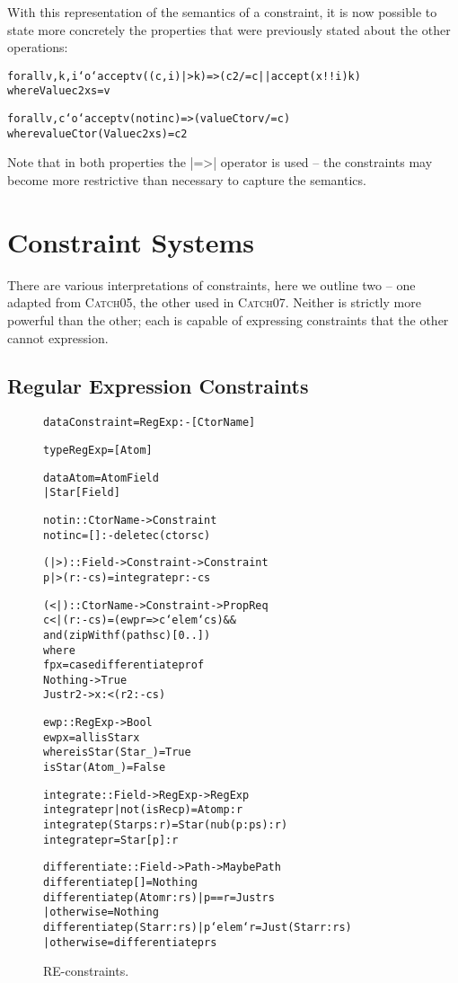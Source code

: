 \documentclass[preprint]{sigplanconf}
\newcommand{\catch}{\textsc{Catch}}
\newenvironment{code}{\begin{alltt}\small}{\end{alltt}}
\begin{document}
With this representation of the semantics of a constraint, it is now possible to state more concretely the properties that were previously stated about the other operations:

\begin{code}
forall v, k, i `o` accept v ((c,i) |> k) => (c2 /= c || accept (x !! i) k)
    where Value c2 xs = v

forall v, c `o` accept v (notin c) => (valueCtor v /= c)
    where valueCtor (Value c2 xs) = c2
\end{code}

Note that in both properties the |=>| operator is used -- the constraints may become more restrictive than necessary to capture the semantics.

\section{Constraint Systems}
\label{sec:constraint}

There are various interpretations of constraints, here we outline two -- one adapted from \catch05, the other used in \catch07. Neither is strictly more powerful than the other; each is capable of expressing constraints that the other cannot expression.

\subsection{Regular Expression Constraints}
\label{sec:regexp}

\begin{figure}
\begin{code}
data Constraint = RegExp :- [CtorName]

type RegExp = [Atom]

data Atom  =  Atom  Field
           |  Star  [Field]

notin :: CtorName -> Constraint
notin c = [] :- delete c (ctors c)

(|>) :: Field -> Constraint -> Constraint
p |> (r :- cs) = integrate p r :- cs

(<|) :: CtorName -> Constraint -> Prop Req
c <| (r :- cs) = (ewp r => c `elem` cs) &&
    and (zipWith f (paths c) [0..])
    where
    f p x = case  differentiate p r of
                  Nothing -> True
                  Just r2 -> x :< (r2 :- cs)

ewp :: RegExp -> Bool
ewp x = all isStar x
   where  isStar (Star  _) = True
          isStar (Atom  _) = False

integrate :: Field -> RegExp -> RegExp
integrate p r | not (isRec p) = Atom p : r
integrate p (Star ps:r) = Star (nub (p:ps) : r)
integrate p r = Star [p] : r

differentiate :: Field -> Path -> Maybe Path
differentiate p [] = Nothing
differentiate p (Atom  r:rs)  | p == r     = Just rs
                              | otherwise  = Nothing
differentiate p (Star  r:rs)  | p `elem` r  = Just (Star r:rs)
                              | otherwise   = differentiate p rs
\end{code}
\caption{RE-constraints.}
\label{fig:regexp}
\end{figure}
\end{document}
